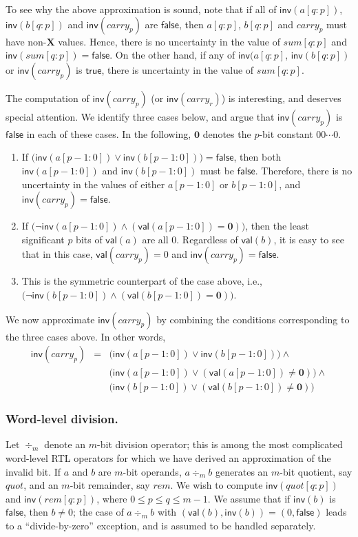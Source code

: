 \documentclass{llncs}
\newcommand{\val}{\ensuremath{\mathsf{val}}}
\newcommand{\inv}{\ensuremath{\mathsf{inv}}}
\newcommand{\true}{\ensuremath{\mathsf{true}}}
\newcommand{\false}{\ensuremath{\mathsf{false}}}
\begin{document}
To see why the above approximation is sound, note that if
all of ${\inv}(a[q:p])$, ${\inv}(b[q:p])$ and ${\inv}(carry_p)$ are
$\false$, then $a[q:p]$, $b[q:p]$ and $carry_p$ must have
non-$\mathbf{X}$ values.  Hence, there is no uncertainty in the value
of $sum[q:p]$ and ${\inv}(sum[q:p]) = \false$.  On the other hand, if
any of ${\inv}(a[q:p]$, ${\inv}(b[q:p])$ or ${\inv}(carry_p)$ is
$\true$, there is uncertainty in the value of $sum[q:p]$.

The computation of ${\inv}(carry_p)$ (or ${\inv}(carry_r)$) is
interesting, and deserves special attention.  We identify three cases
below, and argue that ${\inv}(carry_p)$ is $\false$ in each of these
cases.  In the following, $\mathbf{0}$ denotes the $p$-bit constant
$00\cdots 0$.
\begin{enumerate}
\item If $\big({\inv}(a[p-1:0]) \vee {\inv}(b[p-1:0])\big) = \false$,
  then both ${\inv}(a[p-1:0])$ and ${\inv}(b[p-1:0])$ must be
  $\false$.  Therefore, there is no uncertainty in the values of
  either $a[p-1:0]$ or $b[p-1:0]$, and ${\inv}(carry_p) = \false$.
\item If $\big(\neg{\inv}(a[p-1:0]) \wedge ({\val}(a[p-1:0]) =
  \mathbf{0})\big)$, then the least significant $p$ bits of
  ${\val}(a)$ are all $0$.  Regardless of ${\val}(b)$, it is easy to
  see that in this case, ${\val}(carry_p) = 0$ and ${\inv}(carry_p) =
  \false$.
\item This is the symmetric counterpart of the case above, i.e.,
  $\big(\neg{\inv}(b[p-1:0]) \wedge ({\val}(b[p-1:0]) = \mathbf{0})\big)$.
\end{enumerate}
We now approximate ${\inv}(carry_p)$ by combining the conditions
corresponding to the three cases above.  In other words,
\begin{eqnarray}
 {\inv}(carry_p)  & =  & \big({\inv}(a[p-1:0]) \! \vee \! {\inv}(b[p-1:0])\big) \! \wedge \! \nonumber\\
               \!\!  & \! \!  & \! 
\big({\inv}(a[p-1:0]) \! \vee \! ({\val}(a[p-1:0]) \!  \neq  \! \mathbf{0})\big) \! \wedge \nonumber\\
              \! \!  & \!\!  & \!\big({\inv}(b[p-1:0]) \!\vee \!({\val}(b[p-1:0]) \!\neq  \! \mathbf{0})\big) \nonumber
\end{eqnarray}

\subsubsection{Word-level division.} Let $\div_m$ denote an
$m$-bit division operator; this is among the most complicated
word-level RTL operators for which we have derived an approximation of
the invalid bit.  If $a$ and $b$ are $m$-bit operands, $a \div_m b$
generates an $m$-bit quotient, say $quot$, and an $m$-bit remainder,
say $rem$.  We wish to compute ${\inv}(quot[q:p])$ and
${\inv}(rem[q:p])$, where $0 \le p \le q \le m-1$.  We assume that if
${\inv}(b)$ is $\false$, then $b \neq 0$; the case of $a \div_m b$
with $({\val}(b), {\inv}(b)) = (0, \false)$ leads to a
``divide-by-zero'' exception, and is assumed to be handled separately.
\end{document}
